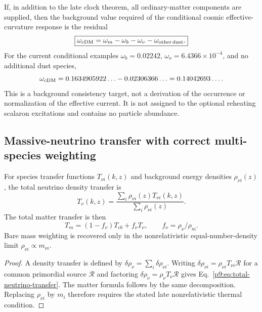 \documentclass[12pt,a4paper]{article}
\begin{document}
\begin{corollary}
\label{p9:cor:H0-dens-closed-baryon}
If, in addition to the late clock theorem, all ordinary-matter components are
supplied, then the background value required of the conditional cosmic
effective-curvature response is the residual
\begin{equation}
\label{p9:eq:omega-phi-residual-repaired}
\boxed{\omega_{\rm cDM}
=\omega_m-\omega_b-\omega_\nu-\omega_{\rm other\,dust}.}
\end{equation}
For the current conditional examples \(\omega_b=0.02242\),
\(\omega_\nu=6.4366\times10^{-4}\), and no additional dust species,
\begin{equation}
\label{p9:eq:omega-phi-residual-number}
\omega_{\rm cDM}
=0.1634905922\ldots-0.02306366\ldots
=0.14042693\ldots .
\end{equation}
This is a background consistency target, not a derivation of the occurrence
or normalization of the effective current.  It is not assigned to the
optional reheating scalaron excitations and contains no particle abundance.
\end{corollary}

\subsection{Massive-neutrino transfer with correct multi-species weighting}
\label{p9:sec:massive-neutrino-handoff}
\begin{theorem}
\label{p9:thm:massive-neutrino-transfer-growth-lensing}
For species transfer functions \(T_{\nu i}(k,z)\) and background energy
densities \(\rho_{\nu i}(z)\), the total neutrino density transfer is
\begin{equation}
\label{p9:eq:total-neutrino-transfer}
T_\nu(k,z)
=\frac{\sum_i\rho_{\nu i}(z)T_{\nu i}(k,z)}
       {\sum_i\rho_{\nu i}(z)}.
\end{equation}
The total matter transfer is then
\begin{equation}
\label{p9:eq:total-matter-transfer-repaired}
T_m=(1-f_\nu)T_{cb}+f_\nu T_\nu,
\qquad f_\nu=\rho_\nu/\rho_m.
\end{equation}
Bare mass weighting is recovered only in the nonrelativistic equal-number-density
limit \(\rho_{\nu i}\propto m_{\nu i}\).
\end{theorem}

\begin{proof}
A density transfer is defined by \(\delta\rho_\nu=\sum_i\delta\rho_{\nu i}\).
Writing \(\delta\rho_{\nu i}=\rho_{\nu i}T_{\nu i}\mathcal R\) for a common
primordial source \(\mathcal R\) and factoring
\(\delta\rho_\nu=\rho_\nu T_\nu\mathcal R\) gives
Eq.~\eqref{p9:eq:total-neutrino-transfer}.  The matter formula follows by the
same decomposition.  Replacing \(\rho_{\nu i}\) by \(m_i\) therefore requires
the stated late nonrelativistic thermal condition.
\end{proof}
\end{document}
